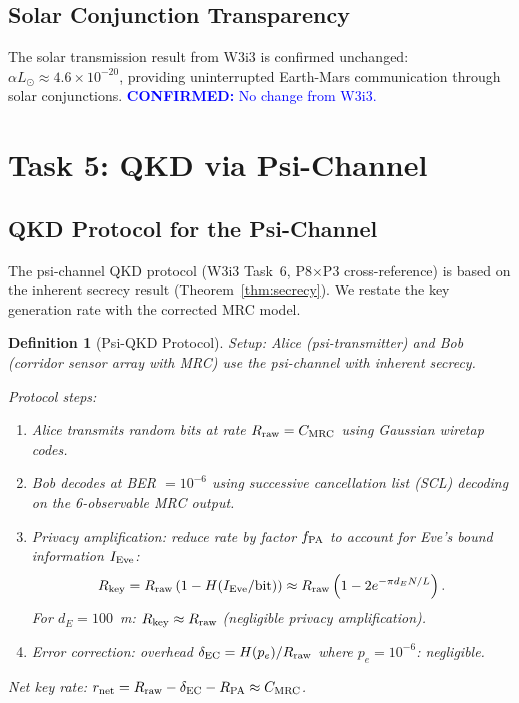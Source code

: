 \documentclass[aps,prd,twocolumn,superscriptaddress,nofootinbib]{revtex4-2}
\newcommand{\confirmed}[1]{\textcolor{blue}{\textbf{CONFIRMED:} #1}}
\newtheorem{definition}{Definition}
\begin{document}
\subsection{Solar Conjunction Transparency}

The solar transmission result from W3i3 is confirmed unchanged:
$\alpha L_\odot \approx 4.6\times10^{-20}$, providing uninterrupted
Earth-Mars communication through solar conjunctions. \confirmed{No change from W3i3.}

\section{Task 5: QKD via Psi-Channel}
\label{sec:qkd}

\subsection{QKD Protocol for the Psi-Channel}

The psi-channel QKD protocol (W3i3 Task~6, P8$\times$P3 cross-reference)
is based on the inherent secrecy result (Theorem~\ref{thm:secrecy}).
We restate the key generation rate with the corrected MRC model.

\begin{definition}[Psi-QKD Protocol]
\label{def:psi-qkd}
\textit{Setup}: Alice (psi-transmitter) and Bob (corridor sensor array with
MRC) use the psi-channel with inherent secrecy.

\textit{Protocol steps}:
\begin{enumerate}
\item Alice transmits random bits at rate $R_{\rm raw} = C_{\rm MRC}$
  using Gaussian wiretap codes.
\item Bob decodes at BER $= 10^{-6}$ using successive cancellation
  list (SCL) decoding on the 6-observable MRC output.
\item Privacy amplification: reduce rate by factor $f_{\rm PA}$ to
  account for Eve's bound information $I_{\rm Eve}$:
  \begin{equation}
  R_{\rm key} = R_{\rm raw}\left(1 - H(I_{\rm Eve}/\text{bit})\right)
  \approx R_{\rm raw}\left(1 - 2e^{-\pi d_E N/L}\right).
  \label{eq:R-key}
  \end{equation}
  For $d_E = 100$~m: $R_{\rm key} \approx R_{\rm raw}$ (negligible privacy
  amplification).
\item Error correction: overhead $\delta_{\rm EC} = H(p_e)/R_{\rm raw}$
  where $p_e = 10^{-6}$: negligible.
\end{enumerate}
Net key rate: $r_{\rm net} = R_{\rm raw} - \delta_{\rm EC} - R_{\rm PA}
\approx C_{\rm MRC}$.
\end{definition}
\end{document}
